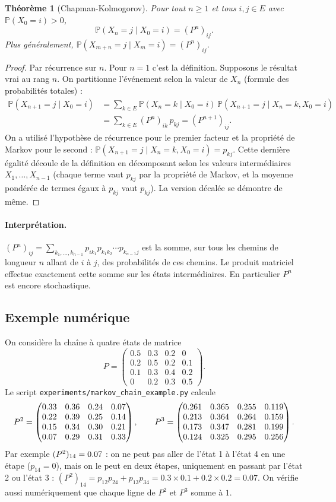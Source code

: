 \documentclass[11pt,a4paper]{article}
\theoremstyle{plain}
\newtheorem{theoreme}{Théorème}[section]
\theoremstyle{definition}
\theoremstyle{remark}
\renewcommand{\P}{\mathbb{P}}
\newcommand{\1}{\mathbf{1}}
\begin{document}
\begin{theoreme}[Chapman-Kolmogorov]\label{thm-ck}
Pour tout $n\ge1$ et tous $i,j\in E$ avec $\P(X_0=i)>0$,
\[
\P(X_n=j\mid X_0=i)=(P^n)_{ij}.
\]
Plus généralement, $\P(X_{m+n}=j\mid X_m=i)=(P^n)_{ij}$.
\end{theoreme}
\begin{proof}
Par récurrence sur $n$. Pour $n=1$ c'est la définition. Supposons le résultat vrai au rang $n$. On partitionne l'événement selon la valeur de $X_n$ (formule des probabilités totales) :
\begin{align*}
\P(X_{n+1}=j\mid X_0=i)
&=\sum_{k\in E}\P(X_n=k\mid X_0=i)\,\P(X_{n+1}=j\mid X_n=k,X_0=i)\\
&=\sum_{k\in E}(P^n)_{ik}\,p_{kj}=(P^{n+1})_{ij}.
\end{align*}
On a utilisé l'hypothèse de récurrence pour le premier facteur et la propriété de Markov pour le second : $\P(X_{n+1}=j\mid X_n=k,X_0=i)=p_{kj}$. Cette dernière égalité découle de la définition en décomposant selon les valeurs intermédiaires $X_1,\dots,X_{n-1}$ (chaque terme vaut $p_{kj}$ par la propriété de Markov, et la moyenne pondérée de termes égaux à $p_{kj}$ vaut $p_{kj}$). La version décalée se démontre de même.
\end{proof}

\paragraph{Interprétation.} $(P^n)_{ij}=\sum_{k_1,\dots,k_{n-1}}p_{ik_1}p_{k_1k_2}\cdots p_{k_{n-1}j}$ est la somme, sur tous les chemins de longueur $n$ allant de $i$ à $j$, des probabilités de ces chemins. Le produit matriciel effectue exactement cette somme sur les états intermédiaires. En particulier $P^n$ est encore stochastique.

\subsection{Exemple numérique}\label{sec-markov-ex}

On considère la chaîne à quatre états de matrice
\[
P=\begin{pmatrix}
0.5&0.3&0.2&0\\
0.2&0.5&0.2&0.1\\
0.1&0.3&0.4&0.2\\
0&0.2&0.3&0.5
\end{pmatrix}.
\]
Le script \texttt{experiments/markov\_chain\_example.py} calcule
\[
P^2=\begin{pmatrix}0.33 & 0.36 & 0.24 & 0.07\\0.22 & 0.39 & 0.25 & 0.14\\0.15 & 0.34 & 0.30 & 0.21\\0.07 & 0.29 & 0.31 & 0.33\end{pmatrix},\qquad P^3=\begin{pmatrix}0.261 & 0.365 & 0.255 & 0.119\\0.213 & 0.364 & 0.264 & 0.159\\0.173 & 0.347 & 0.281 & 0.199\\0.124 & 0.325 & 0.295 & 0.256\end{pmatrix}.
\]
Par exemple $(P^2)_{14}=0.07$ : on ne peut pas aller de l'état 1 à l'état 4 en une étape ($p_{14}=0$), mais on le peut en deux étapes, uniquement en passant par l'état 2 ou l'état 3 : $(P^2)_{14}=p_{12}p_{24}+p_{13}p_{34}=0.3\times0.1+0.2\times0.2=0.07$. On vérifie aussi numériquement que chaque ligne de $P^2$ et $P^3$ somme à $1$.
\end{document}
